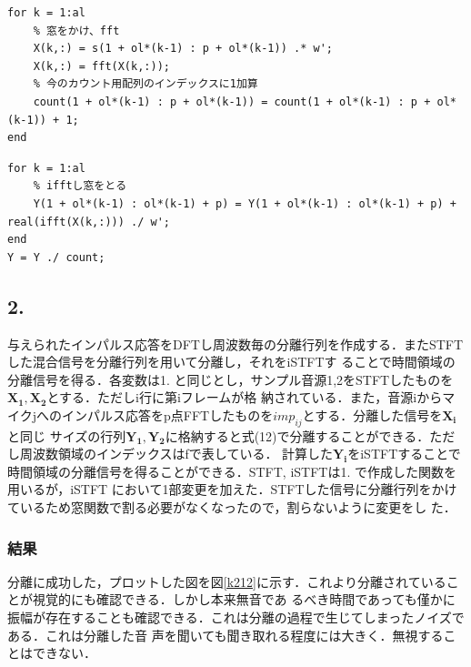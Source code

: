 \documentclass[a4j]{jarticle}
\begin{document}
\begin{lstlisting}[caption=stft.m, xleftmargin=1cm, label=stft.m]
for k = 1:al
    % 窓をかけ、fft
    X(k,:) = s(1 + ol*(k-1) : p + ol*(k-1)) .* w';
    X(k,:) = fft(X(k,:));
    % 今のカウント用配列のインデックスに1加算
    count(1 + ol*(k-1) : p + ol*(k-1)) = count(1 + ol*(k-1) : p + ol*(k-1)) + 1;
end
\end{lstlisting}
\begin{lstlisting}[caption=istft.m, xleftmargin=1cm, label=istft.m]
for k = 1:al
    % ifftし窓をとる
    Y(1 + ol*(k-1) : ol*(k-1) + p) = Y(1 + ol*(k-1) : ol*(k-1) + p) + real(ifft(X(k,:))) ./ w';
end
Y = Y ./ count;
\end{lstlisting}

\subsection*{2.}
与えられたインパルス応答をDFTし周波数毎の分離行列を作成する．またSTFTした混合信号を分離行列を用いて分離し，それをiSTFTす
ることで時間領域の分離信号を得る．各変数は1. と同じとし，サンプル音源1,2をSTFTしたものを$\bm{X_1}, \bm{X_2}$とする．ただしi行に第iフレームが格
納されている．また，音源iからマイクjへのインパルス応答をp点FFTしたものを$imp_{ij}$とする．分離した信号を$\bm{X_i}$と同じ
サイズの行列$\bm{Y_1}, \bm{Y_2}$に格納すると式(12)で分離することができる．ただし周波数領域のインデックスはfで表している．
計算した$\bm{Y_i}$をiSTFTすることで時間領域の分離信号を得ることができる．STFT, iSTFTは1. で作成した関数を用いるが，iSTFT
において1部変更を加えた．STFTした信号に分離行列をかけているため窓関数で割る必要がなくなったので，割らないように変更をし
た．
\subsubsection*{結果}
分離に成功した，プロットした図を図\ref{k212}に示す．これより分離されていることが視覚的にも確認できる．しかし本来無音であ
るべき時間であっても僅かに振幅が存在することも確認できる．これは分離の過程で生じてしまったノイズである．これは分離した音
声を聞いても聞き取れる程度には大きく．無視することはできない．
\end{document}
